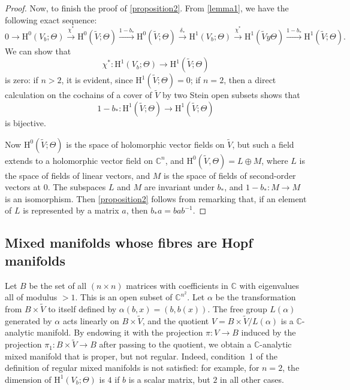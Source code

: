 \documentclass{article}
\theoremstyle{plain}
\theoremstyle{definition}
\newcommand{\CC}{\mathbb{C}}
\newcommand{\HH}{\mathrm{H}}
\newcommand{\oldpage}[1]{\marginpar{\footnotesize$\Big\vert$ \textit{p.~#1}}}
\begin{document}
\begin{proof}
  Now, to finish the proof of \cref{proposition2}.
  From \cref{lemma1}, we have the following exact sequence:
  \[
    0
    \to \HH^0(V_b;\Theta)
    \xrightarrow{\chi^*} \HH^0(\widetilde{V};\Theta)
    \xrightarrow{1-b_*} \HH^0(\widetilde{V};\Theta)
    \xrightarrow{\delta_*} \HH^1(V_b;\Theta)
    \xrightarrow{\chi^*} \HH^1(\widetilde{V}y\Theta)
    \xrightarrow{1-b_*} \HH^1(\widetilde{V};\Theta).
  \]
  We can show that
  \[
    \chi^*\colon \HH^1(V_b;\Theta) \to \HH^1(\widetilde{V};\Theta)
  \]
  is zero:
  if $n>2$, it is evident, since $\HH^1(\widetilde{V};\Theta)=0$;
  if $n=2$, then a direct calculation on the cochains of a cover of $\widetilde{V}$ by two Stein open subsets shows that
  \[
    1-b_*\colon \HH^1(\widetilde{V};\Theta) \to \HH^1(\widetilde{V};\Theta)
  \]
  is bijective.

  Now $\HH^0(\widetilde{V};\Theta)$ is the space of holomorphic vector fields on $\widetilde{V}$, but such a field extends to a holomorphic vector field on $\CC^n$, and $\HH^0(\widetilde{V},\Theta)=L\oplus M$, where $L$ is the space of fields of linear vectors, and $M$ is the space of fields of second-order vectors at $0$.
  The subspaces $L$ and $M$ are invariant under $b_*$, and $1-b_*\colon M\to M$ is an isomorphism.
  Then \cref{proposition2} follows from remarking that, if an element of $L$ is represented by a matrix $a$, then $b_*a=bab^{-1}$.
\end{proof}


\subsection{Mixed manifolds whose fibres are Hopf manifolds}
\label{III.2}

\oldpage{3-06}
Let $B$ be the set of all $(n\times n)$ matrices with coefficients in $\CC$ with eigenvalues all of modulus $>1$.
This is an open subset of $\CC^{n^2}$.
Let $\alpha$ be the transformation from $B\times\widetilde{V}$ to itself defined by $\alpha(b,x)=(b,b(x))$.
The free group $L(\alpha)$ generated by $\alpha$ acts linearly on $B\times\widetilde{V}$, and the quotient $V=B\times\widetilde{V}/L(\alpha)$ is a $\CC$-analytic manifold.
By endowing it with the projection $\pi\colon V\to B$ induced by the projection $\pi_1\colon B\times\widetilde{V}\to B$ after passing to the quotient, we obtain a $\CC$-analytic mixed manifold that is proper, but not regular.
Indeed, condition~1 of the definition of regular mixed manifolds is not satisfied: for example, for $n=2$, the dimension of $\HH^1(V_b;\Theta)$ is $4$ if $b$ is a scalar matrix, but $2$ in all other cases.
\end{document}
